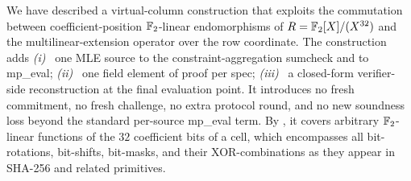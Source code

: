 We have described a virtual-column construction that exploits the
commutation between coefficient-position $\mathbb{F}_2$-linear endomorphisms
of $R = \mathbb{F}_2[X]/(X^{32})$ and the multilinear-extension
operator over the row coordinate. The construction adds
\emph{(i)}~ one MLE source to the constraint-aggregation sumcheck and
to mp\_eval; \emph{(ii)}~ one field element of proof per spec;
\emph{(iii)}~ a closed-form verifier-side reconstruction at the final
evaluation point. It introduces no fresh commitment, no fresh
challenge, no extra protocol round, and no new soundness loss beyond
the standard per-source mp\_eval term. By
, it covers arbitrary $\mathbb{F}_2$-linear functions of
the $32$ coefficient bits of a cell, which encompasses all
bit-rotations, bit-shifts, bit-masks, and their XOR-combinations as
they appear in SHA-256 and related primitives.
